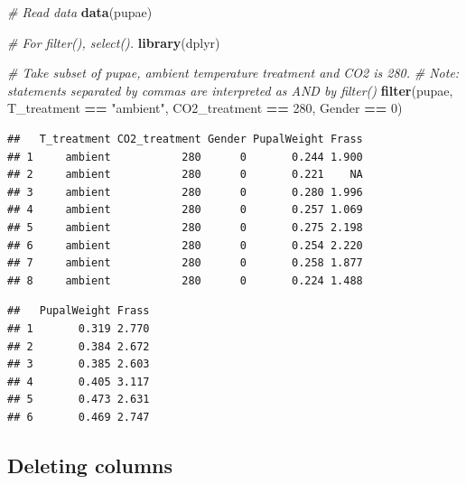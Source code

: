 \documentclass[]{book}
\newenvironment{Shaded}{\begin{snugshade}}{\end{snugshade}}
\newcommand{\CommentTok}[1]{\textcolor[rgb]{0.56,0.35,0.01}{\textit{#1}}}
\newcommand{\DecValTok}[1]{\textcolor[rgb]{0.00,0.00,0.81}{#1}}
\newcommand{\FloatTok}[1]{\textcolor[rgb]{0.00,0.00,0.81}{#1}}
\newcommand{\KeywordTok}[1]{\textcolor[rgb]{0.13,0.29,0.53}{\textbf{#1}}}
\newcommand{\NormalTok}[1]{#1}
\newcommand{\OperatorTok}[1]{\textcolor[rgb]{0.81,0.36,0.00}{\textbf{#1}}}
\newcommand{\StringTok}[1]{\textcolor[rgb]{0.31,0.60,0.02}{#1}}
\begin{document}
\begin{Shaded}
\begin{Highlighting}[]
\CommentTok{# Read data}
\KeywordTok{data}\NormalTok{(pupae)}

\CommentTok{# For filter(), select().}
\KeywordTok{library}\NormalTok{(dplyr)}

\CommentTok{# Take subset of pupae, ambient temperature treatment and CO2 is 280.}
\CommentTok{# Note: statements separated by commas are interpreted as AND by filter()}
\KeywordTok{filter}\NormalTok{(pupae, }
\NormalTok{       T_treatment }\OperatorTok{==}\StringTok{ "ambient"}\NormalTok{,}
\NormalTok{       CO2_treatment }\OperatorTok{==}\StringTok{ }\DecValTok{280}\NormalTok{,}
\NormalTok{       Gender }\OperatorTok{==}\StringTok{ }\DecValTok{0}\NormalTok{)}
\end{Highlighting}
\end{Shaded}

\begin{verbatim}
##   T_treatment CO2_treatment Gender PupalWeight Frass
## 1     ambient           280      0       0.244 1.900
## 2     ambient           280      0       0.221    NA
## 3     ambient           280      0       0.280 1.996
## 4     ambient           280      0       0.257 1.069
## 5     ambient           280      0       0.275 2.198
## 6     ambient           280      0       0.254 2.220
## 7     ambient           280      0       0.258 1.877
## 8     ambient           280      0       0.224 1.488
\end{verbatim}

\begin{Shaded}
\end{Shaded}

\begin{verbatim}
##   PupalWeight Frass
## 1       0.319 2.770
## 2       0.384 2.672
## 3       0.385 2.603
## 4       0.405 3.117
## 5       0.473 2.631
## 6       0.469 2.747
\end{verbatim}

\hypertarget{deleting-columns}{%
\subsection{Deleting columns}\label{deleting-columns}}
\end{document}
